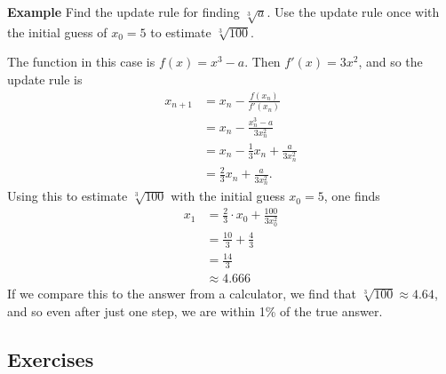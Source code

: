 \documentclass[twoside,openright,titlepage,a4paper]{book}
\begin{document}
\begin{sloppypar}
\textbf{Example} Find the update rule for finding $\sqrt[3]{a}$. Use the update rule once with the initial guess of $x_0 = 5$ to estimate $\sqrt[3]{100}$.
\begin{examplebox}
The function in this case is $f(x) = x^3-a$. Then $f'(x) = 3x^2$, and so the update rule is
\begin{align*}
x_{n+1} &= x_n - \frac{f(x_n)}{f'(x_n)} \\
&= x_n - \frac{x_n^3-a}{3x_n^2} \\
&= x_n - \frac{1}{3}x_n + \frac{a}{3x_n^2} \\
&= \frac{2}{3}x_n + \frac{a}{3x_n^2}.
\end{align*}
Using this to estimate $\sqrt[3]{100}$ with the initial guess $x_0 = 5$, one finds
\begin{align*}
x_1 &= \frac{2}{3}\cdot x_0 + \frac{100}{3 x_0^2} \\
&= \frac{10}{3} + \frac{4}{3} \\
&= \frac{14}{3} \\
& \approx 4.666
\end{align*}
If we compare this to the answer from a calculator, we find that $\sqrt[3]{100} \approx 4.64$, and so even after just one step, we are within 1\% of the true answer.	
\end{examplebox}
		
\subsection{Exercises}


\end{sloppypar}
\end{document}
